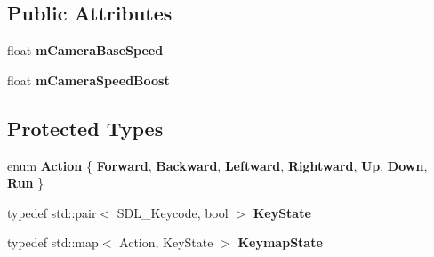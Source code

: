 \subsection*{Public Attributes}
\begin{DoxyCompactItemize}
\item 
\mbox{\label{class_common_1_1_camera_controller_a89119788b0320e34bd0322006bbd9734}} 
float {\bfseries m\+Camera\+Base\+Speed}
\item 
\mbox{\label{class_common_1_1_camera_controller_a043ce9247c01a9cc852b7e58e0b46e06}} 
float {\bfseries m\+Camera\+Speed\+Boost}
\end{DoxyCompactItemize}
\subsection*{Protected Types}
\begin{DoxyCompactItemize}
\item 
\mbox{\label{class_common_1_1_camera_controller_af299b39b39b578b2235220e5fa8dfc01}} 
enum {\bfseries Action} \{ \newline
{\bfseries Forward}, 
{\bfseries Backward}, 
{\bfseries Leftward}, 
{\bfseries Rightward}, 
\newline
{\bfseries Up}, 
{\bfseries Down}, 
{\bfseries Run}
 \}
\item 
\mbox{\label{class_common_1_1_camera_controller_a75aa76cde460aabcb220ca664f3d40a1}} 
typedef std\+::pair$<$ S\+D\+L\+\_\+\+Keycode, bool $>$ {\bfseries Key\+State}
\item 
\mbox{\label{class_common_1_1_camera_controller_a33ec61812e24b2f120a08127435c52dc}} 
typedef std\+::map$<$ Action, Key\+State $>$ {\bfseries Keymap\+State}
\end{DoxyCompactItemize}
